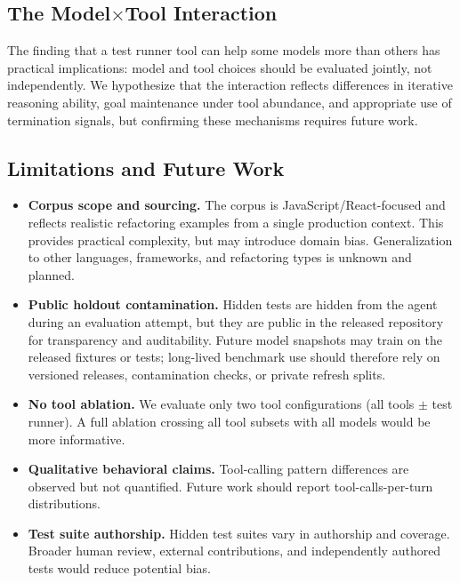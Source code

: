 \documentclass[11pt,letterpaper]{article}
\begin{document}
\subsection{\texorpdfstring{The Model$\times$Tool Interaction}{The Model x Tool Interaction}}

The finding that a test runner tool can help some models more than others has practical implications: model and tool choices should be evaluated jointly, not independently. We hypothesize that the interaction reflects differences in iterative reasoning ability, goal maintenance under tool abundance, and appropriate use of termination signals, but confirming these mechanisms requires future work.

\subsection{Limitations and Future Work}

\begin{itemize}[leftmargin=2em]
\item \textbf{Corpus scope and sourcing.} The corpus is JavaScript/React-focused and reflects realistic refactoring examples from a single production context. This provides practical complexity, but may introduce domain bias. Generalization to other languages, frameworks, and refactoring types is unknown and planned.
\item \textbf{Public holdout contamination.} Hidden tests are hidden from the agent during an evaluation attempt, but they are public in the released repository for transparency and auditability. Future model snapshots may train on the released fixtures or tests; long-lived benchmark use should therefore rely on versioned releases, contamination checks, or private refresh splits.
\item \textbf{No tool ablation.} We evaluate only two tool configurations (all tools $\pm$ test runner). A full ablation crossing all tool subsets with all models would be more informative.
\item \textbf{Qualitative behavioral claims.} Tool-calling pattern differences are observed but not quantified. Future work should report tool-calls-per-turn distributions.
\item \textbf{Test suite authorship.} Hidden test suites vary in authorship and coverage. Broader human review, external contributions, and independently authored tests would reduce potential bias.
\end{itemize}
\end{document}

